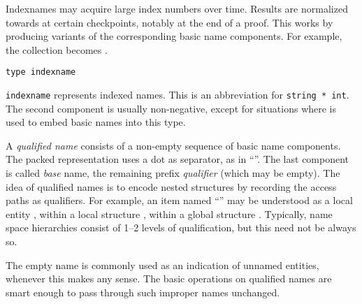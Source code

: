 \begin{isabellebody}
\begin{isamarkuptext}
  Indexnames may acquire large index numbers over time.  Results are
  normalized towards  at certain checkpoints, notably at
  the end of a proof.  This works by producing variants of the
  corresponding basic name components.  For example, the collection
   becomes .%
\end{isamarkuptext}%
\isamarkuptrue%
%
\isadelimmlref
%
\endisadelimmlref
%
\isatagmlref
%
\begin{isamarkuptext}%
\begin{mldecls}
  \verb|type indexname| \\
  \end{mldecls}

  \begin{description}

  \item \verb|indexname| represents indexed names.  This is an
  abbreviation for \verb|string * int|.  The second component is
  usually non-negative, except for situations where 
  is used to embed basic names into this type.

  \end{description}%
\end{isamarkuptext}%
\isamarkuptrue%
%
\endisatagmlref
{\isafoldmlref}%
%
\isadelimmlref
%
\endisadelimmlref
%
\isamarkuptrue%
%
\begin{isamarkuptext}%
A \emph{qualified name} consists of a non-empty sequence of basic
  name components.  The packed representation uses a dot as separator,
  as in ``''.  The last component is called \emph{base}
  name, the remaining prefix \emph{qualifier} (which may be empty).
  The idea of qualified names is to encode nested structures by
  recording the access paths as qualifiers.  For example, an item
  named ``'' may be understood as a local entity , within a local structure , within a global
  structure .  Typically, name space hierarchies consist of
  1--2 levels of qualification, but this need not be always so.

  The empty name is commonly used as an indication of unnamed
  entities, whenever this makes any sense.  The basic operations on
  qualified names are smart enough to pass through such improper names
  unchanged.


\end{isamarkuptext}
\end{isabellebody}
